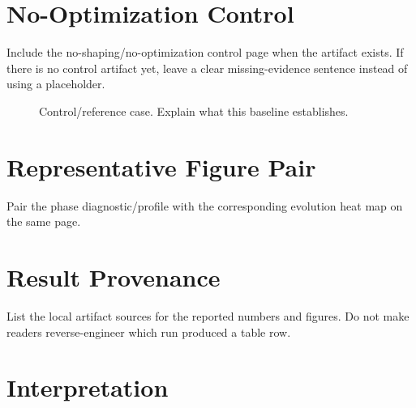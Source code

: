 \documentclass[11pt]{article}
\begin{document}
\clearpage
\section{No-Optimization Control}

Include the no-shaping/no-optimization control page when the artifact exists.
If there is no control artifact yet, leave a clear missing-evidence sentence
instead of using a placeholder.

\begin{figure}[H]
\centering
\caption{Control/reference case. Explain what this baseline establishes.}
\end{figure}

\clearpage
\section{Representative Figure Pair}

Pair the phase diagnostic/profile with the corresponding evolution heat map on
the same page.

\begin{figure}[H]
\centering
\begin{minipage}{0.48\linewidth}
\centering
\end{minipage}\hfill
\begin{minipage}{0.48\linewidth}
\centering
\end{minipage}
\end{figure}

\section{Result Provenance}

List the local artifact sources for the reported numbers and figures.  Do not
make readers reverse-engineer which run produced a table row.

\section{Interpretation}
\end{document}
